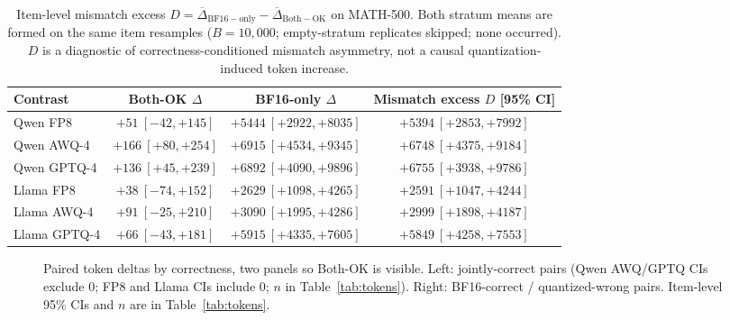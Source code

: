 \documentclass[11pt,a4paper]{article}
\begin{document}
\begin{table}[!htbp]
\centering
\caption{Item-level mismatch excess $D=\overline{\Delta}_{\mathrm{BF16-only}}-\overline{\Delta}_{\mathrm{Both-OK}}$ on MATH-500. Both stratum means are formed on the same item resamples ($B=10{,}000$; empty-stratum replicates skipped; none occurred). $D$ is a diagnostic of correctness-conditioned mismatch asymmetry, not a causal quantization-induced token increase.}
\label{tab:mismatch-excess}
\small
\begin{tabular}{lccc}
\toprule
\textbf{Contrast} & \textbf{Both-OK $\Delta$} & \textbf{BF16-only $\Delta$} & \textbf{Mismatch excess $D$ [95\% CI]} \\
\midrule
Qwen FP8     & $+51\ [-42,+145]$ & $+5444\ [+2922,+8035]$ & $+5394\ [+2853,+7992]$ \\
Qwen AWQ-4   & $+166\ [+80,+254]$ & $+6915\ [+4534,+9345]$ & $+6748\ [+4375,+9184]$ \\
Qwen GPTQ-4  & $+136\ [+45,+239]$ & $+6892\ [+4090,+9896]$ & $+6755\ [+3938,+9786]$ \\
Llama FP8    & $+38\ [-74,+152]$ & $+2629\ [+1098,+4265]$ & $+2591\ [+1047,+4244]$ \\
Llama AWQ-4  & $+91\ [-25,+210]$ & $+3090\ [+1995,+4286]$ & $+2999\ [+1898,+4187]$ \\
Llama GPTQ-4 & $+66\ [-43,+181]$ & $+5915\ [+4335,+7605]$ & $+5849\ [+4258,+7553]$ \\
\bottomrule
\end{tabular}
\end{table}

\begin{figure}[!htbp]
\centering
{}
\caption{Paired token deltas by correctness, two panels so Both-OK is visible. Left: jointly-correct pairs (Qwen AWQ/GPTQ CIs exclude 0; FP8 and Llama CIs include 0; $n$ in Table~\ref{tab:tokens}). Right: BF16-correct / quantized-wrong pairs. Item-level 95\% CIs and $n$ are in Table~\ref{tab:tokens}.}
\label{fig:strata}
\end{figure}
\end{document}

